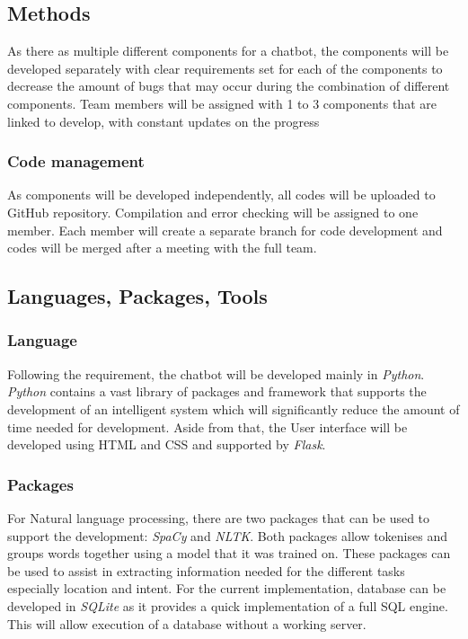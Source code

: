 \documentclass[11pt]{article}
\begin{document}
\subsection{Methods}
As there as multiple different components for a chatbot, the components will be developed separately with clear requirements set for each of the components to decrease the amount of bugs that may occur during the combination of different components. Team members will be assigned with 1 to 3 components that are linked to develop, with constant updates on the progress

\subsubsection{Code management}
As components will be developed independently, all codes will be uploaded to GitHub repository. Compilation and error checking will be assigned to one member. Each member will create a separate branch for code development and codes will be merged after a meeting with the full team.
             
\subsection{Languages, Packages, Tools}

\subsubsection{Language}
Following the requirement, the chatbot will be developed mainly in \textit{Python}. \textit{Python} contains a vast library of packages and framework that supports the development of an intelligent system which will significantly reduce the amount of time needed for development. Aside from that, the User interface will be developed using HTML and CSS and supported by \textit{Flask}.

\subsubsection{Packages}
For Natural language processing, there are two packages that can be used to support the development: \textit{SpaCy} and \textit{NLTK}. Both packages allow tokenises and groups words together using a model that it was trained on. These packages can be used to assist in extracting information needed for the different tasks especially location and intent. For the current implementation, database can be developed in \textit{SQLite} as it provides a quick implementation of a full SQL engine. This will allow execution of a database without a working server.
\end{document}
